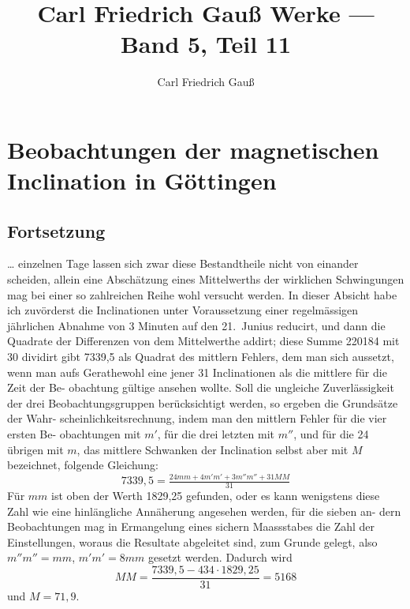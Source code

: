 \documentclass[12pt,a4paper]{article}
\title{Carl Friedrich Gau\ss{} Werke --- Band 5, Teil 11}
\author{Carl Friedrich Gau\ss}
\date{}
\begin{document}
\maketitle
\thispagestyle{empty}

\tableofcontents
\newpage

\section*{Beobachtungen der magnetischen Inclination in Göttingen}

\subsection*{Fortsetzung}

\noindent
\ldots{} einzelnen Tage lassen sich zwar diese Bestandtheile nicht von einander scheiden, 
allein eine Abschätzung eines Mittelwerths der wirklichen Schwingungen mag 
bei einer so zahlreichen Reihe wohl versucht werden. In dieser Absicht habe ich 
zuvörderst die Inclinationen unter Voraussetzung einer regelmässigen jährlichen 
Abnahme von 3 Minuten auf den 21.\ Junius reducirt, und dann die Quadrate der 
Differenzen von dem Mittelwerthe addirt; diese Summe 220184 mit 30 dividirt 
gibt 7339,5 als Quadrat des mittlern Fehlers, dem man sich aussetzt, wenn man 
aufs Gerathewohl eine jener 31 Inclinationen als die mittlere für die Zeit der Be-
obachtung gültige ansehen wollte. Soll die ungleiche Zuverlässigkeit der drei 
Beobachtungsgruppen berücksichtigt werden, so ergeben die Grundsätze der Wahr-
scheinlichkeitsrechnung, indem man den mittlern Fehler für die vier ersten Be-
obachtungen mit $m'$, für die drei letzten mit $m''$, und für die 24 übrigen mit $m$, 
das mittlere Schwanken der Inclination selbst aber mit $M$ bezeichnet, folgende 
Gleichung:
\[
7339{,}5 = \tfrac{24mm + 4m'm' + 3m''m'' + 31MM}{31}
\]
Für $mm$ ist oben der Werth 1829,25 gefunden, oder es kann wenigstens diese 
Zahl wie eine hinlängliche Annäherung angesehen werden, für die sieben an-
dern Beobachtungen mag in Ermangelung eines sichern Maassstabes die Zahl der 
Einstellungen, woraus die Resultate abgeleitet sind, zum Grunde gelegt, also 
$m''m'' = mm$, $m'm' = 8mm$
gesetzt werden. Dadurch wird
\[
MM = \frac{7339{,}5 - 434\cdot 1829{,}25}{31} = 5168
\]
und $M = 71{,}9$.
\end{document}
